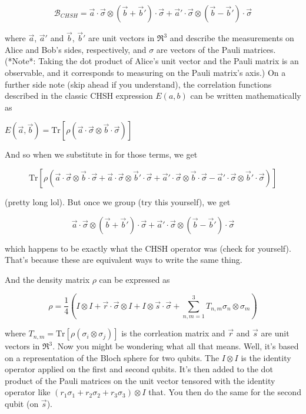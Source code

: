 \documentclass[a4paper, onecolumn, 11pt, titlepage]{quantumarticle}
\begin{document}
\begin{appendices}
$$\mathcal{B}_{CHSH} = \vec{a} \cdot \vec{\sigma} \otimes \left(\vec{b} +\vec{b}' \right) \cdot \vec{\sigma} + \vec{a}' \cdot \vec{\sigma} \otimes \left(\vec{b} - \vec{b}'\right) \cdot \vec{\sigma}$$

where $\vec{a}$, $\vec{a}'$ and $\vec{b}$, $\vec{b}'$ are unit vectors in $\mathfrak{R}^3$ and describe the measurements on Alice and Bob's sides, respectively, and $\sigma$ are vectors of the Pauli matrices. (*Note*: Taking the dot product of Alice's unit vector and the Pauli matrix is an observable, and it corresponds to measuring on the Pauli matrix's axis.) On a further side note (skip ahead if you understand), the correlation functions described in the classic CHSH expression $E(a, b)$ can be written mathematically as 

$E(\vec{a},\vec{b}) = \text{Tr} \left[\rho \left(\vec{a} \cdot \vec{\sigma} \otimes \vec{b} \cdot \vec{\sigma} \right) \right]$

And so when we substitute in for those terms, we get

$$ \text{Tr} \left[ \rho \left(\vec{a} \cdot \vec{\sigma} \otimes \vec{b}\cdot \vec{\sigma} + \vec{a} \cdot \vec{\sigma} \otimes \vec{b}' \cdot\vec{\sigma} + \vec{a}' \cdot \vec{\sigma} \otimes \vec{b} \cdot \vec{\sigma} - \vec{a}' \cdot \vec{\sigma} \otimes \vec{b}' \cdot \vec{\sigma} \right) \right] $$

(pretty long lol). But once we group (try this yourself), we get

$$\vec{a} \cdot \vec{\sigma} \otimes \left(\vec{b} +\vec{b}' \right) \cdot \vec{\sigma} + \vec{a}' \cdot \vec{\sigma} \otimes \left(\vec{b} - \vec{b}'\right) \cdot \vec{\sigma}$$

which happens to be exactly what the CHSH operator was (check for yourself). That's because these are equivalent ways to write the same thing.


And the density matrix $\rho$ can be expressed as 

$$\rho = \frac{1}{4}\left(I\otimes I + \vec{r} \cdot \vec{\sigma} \otimes I + I \otimes \vec{s} \cdot \vec{\sigma} + \sum_{n, m = 1}^{3}{T_{n,m}\sigma_n \otimes \sigma_m}\right) $$

where $T_{n,m} = \text{Tr} \left[\rho \left(\sigma_i \otimes \sigma_j \right)\right]$ is the corrleation matrix and $\vec{r}$ and $\vec{s}$ are unit vectors in $\mathfrak{R}^3$. Now you might be wondering what all that means. Well, it's based on a representation of the Bloch sphere for two qubits. The $I \otimes I$ is the identity operator applied on the first and second qubits. It's then added to the dot product of the Pauli matrices on the unit vector tensored with the identity operator like $(r_1 \sigma_1 +r_2 \sigma_2 + r_3 \sigma_3) \otimes I$ that. You then do the same for the second qubit (on $\vec{s}$).


\end{appendices}
\end{document}

